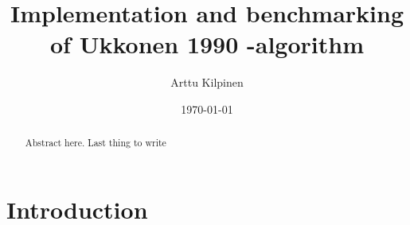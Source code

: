 \documentclass[english,twoside,censored,csm,algorithms-track-2020]{HYthesisML}
\title{Implementation and benchmarking of Ukkonen 1990 -algorithm}
\author{Arttu Kilpinen}
\date{\today}
\theoremstyle{plain}
\theoremstyle{definition}
\begin{document}
\maketitle



\begin{abstract}

  Abstract here. Last thing to write

\end{abstract}

\newpage
\mytableofcontents
\mainmatter


%
%
%
%




\chapter{Introduction}~\label{chp-intro}

\end{document}
